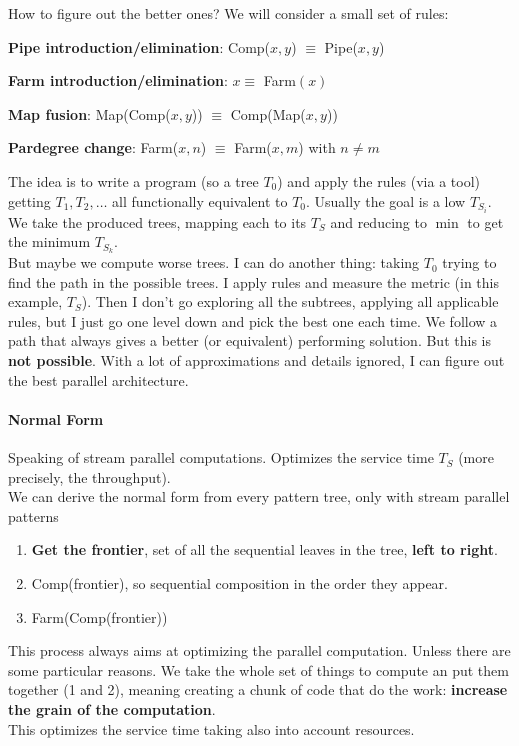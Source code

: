 \documentclass[10pt]{report}
\begin{document}
How to figure out the better ones? We will consider a small set of rules:
\begin{list}{}{}
	\item \textbf{Pipe introduction/elimination}: Comp($x,y$) $\equiv$ Pipe($x,y$)
	\item \textbf{Farm introduction/elimination}: $x \equiv$ Farm$(x)$
	\item \textbf{Map fusion}: Map(Comp($x,y$)) $\equiv$ Comp(Map($x,y$))
	\item \textbf{Pardegree change}: Farm($x, n$) $\equiv$ Farm($x, m$) with $n\neq m$
\end{list}
The idea is to write a program (so a tree $T_0$) and apply the rules (via a tool) getting $T_1,T_2,\ldots$ all functionally equivalent to $T_0$. Usually the goal is a low $T_{S_i}$. We take the produced trees, mapping each to its $T_S$ and reducing to $\min$ to get the minimum $T_{S_k}$.\\
But maybe we compute worse trees. I can do another thing: taking $T_0$ trying to find the path in the possible trees. I apply rules and measure the metric (in this example, $T_S$). Then I don't go exploring all the subtrees, applying all applicable rules, but I just go one level down and pick the best one each time. We follow a path that always gives a better (or equivalent) performing solution. But this is \textbf{not possible}.
With a lot of approximations and details ignored, I can figure out the best parallel architecture.
\paragraph{Normal Form} Speaking of stream parallel computations. Optimizes the service time $T_S$ (more precisely, the throughput).\\
We can derive the normal form from every pattern tree, only with stream parallel patterns\begin{enumerate}
	\item \textbf{Get the frontier}, set of all the sequential leaves in the tree, \textbf{left to right}.
	\item Comp(frontier), so sequential composition in the order they appear.
	\item Farm(Comp(frontier))
\end{enumerate}
This process always aims at optimizing the parallel computation. Unless there are some particular reasons. We take the whole set of things to compute an put them together (1 and 2), meaning creating a chunk of code that do the work: \textbf{increase the grain of the computation}.\\
This optimizes the service time taking also into account resources.
\end{document}
